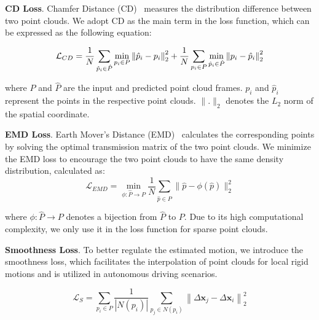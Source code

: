 \documentclass[10pt,twocolumn,letterpaper]{article}
\begin{document}
\textbf{CD Loss}. Chamfer Distance (CD)~\cite{fan2017point} measures the distribution difference between two point clouds. We adopt CD as the main term in the loss function, which can be expressed as the following equation:  
\vspace{-.05cm}
\begin{small}
\begin{equation}
\setlength\belowdisplayskip{0.05cm}
\label{eq: CD}
\begin{split}
    \mathcal{L}_{CD}=\frac{1}{N} \sum_{\hat{p}_{i} \in \hat{P}} \min _{p_{i} \in P}\left\|\hat{p}_{i}-p_{i}\right\|^{2}_{2}
    +\frac{1}{N} \sum_{p_{i} \in P} \min _{\hat{p}_{i} \in \hat{P}}\left\|p_{i}-\hat{p}_{i}\right\|^{2}_{2}
\end{split}
\end{equation}
\end{small}
\vspace{-.05cm}
\noindent where $P$ and $\hat{P}$ are the input and predicted point cloud frames. $ p_{i} $ and $ \hat{p}_{i} $ represent the points in the respective point clouds. $ \| . \|_2$ denotes the $L_2$ norm of the spatial coordinate.  



\textbf{EMD Loss}. Earth Mover's Distance (EMD)~\cite{rubner2000earth} calculates the corresponding points by solving the optimal transmission matrix of the two point clouds. We minimize the EMD loss to encourage the two point clouds to have the same density distribution, calculated as:
\vspace{-.1cm}
\begin{equation}
\label{eq: EMD}
     \mathcal{L}_{EMD}=\min _{\phi: \hat{P} \rightarrow P} \frac{1}{N} \sum_{\hat{p} \in \hat{P}}\|\hat{p}-\phi\left(\hat{p}\right)\|^{2}_{2}
\end{equation}
\vspace{-.4cm}

\noindent where $ \phi: \hat{P} \rightarrow P $ denotes a bijection from $ \hat{P} $ to $  P $. Due to its high computational complexity, we only use it in the loss function for sparse point clouds. 


\textbf{Smoothness Loss}. To better regulate the estimated motion, we introduce the smoothness loss, which facilitates the interpolation of point clouds for local rigid motions and is utilized in autonomous driving scenarios.  
\vspace{-.05cm}
\begin{small}
\begin{equation}
\mathcal{L}_{S}=\sum_{p_{i} \in P} \frac{1}{\left|N\left(p_{i}\right)\right|} \sum_{p_{j} \in N\left(p_{i}\right)}\left\|\Delta \mathbf{x}_j -\Delta \mathbf{x}_i \right\|_{2}^{2}
\end{equation}
\end{small}
\end{document}
